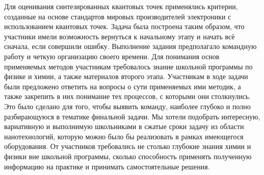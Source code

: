 Для оценивания синтезированных квантовых точек применялись критерии, созданные на основе стандартов мировых производителей электроники с использованием квантовых точек. Задача была построена таким образом, что участники имели возможность вернуться к начальному этапу и начать всё сначала, если совершили ошибку. Выполнение задания предполагало командную работу и четкую организацию своего времени. Для понимания основ применяемых методов участникам требовалось знание школьной программы по физике и химии, а также материалов второго этапа. Участникам в ходе задачи были предложено ответить на вопросы о сути применяемых ими методик, а также закрепить в них понимание тех процессов, с которыми они столкнулись. Это было сделано для того, чтобы выявить команду, наиболее глубоко и полно разбирающуюся в тематике финальной задачи. Мы хотели подобрать интересную, вариативную и выполнимую школьниками в сжатые сроки задачу из области нанотехнологий, которую можно было бы реализовать в рамках имеющегося оборудования. От участников требовались не столько глубокие знания химии и физики вне школьной программы, сколько способность применять полученную информацию на практике и принимать самостоятельные решения.